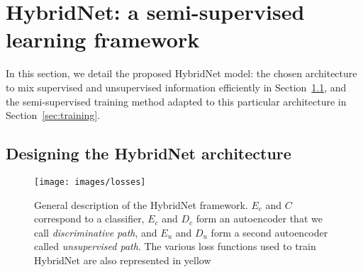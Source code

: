 \documentclass[runningheads]{llncs}
\begin{document}
\section{HybridNet: a semi-supervised learning framework}
\label{sec:architecture}

In this section, we detail the proposed HybridNet model: the chosen architecture to mix supervised and unsupervised information efficiently in Section~\ref{sec:archi}, and the semi-supervised training method adapted to this particular architecture in Section~\ref{sec:training}.

\subsection{Designing the HybridNet architecture}
\label{sec:archi}

\begin{figure}[tb]
	\centering
	\texttt{[image: images/losses]}
    \caption{General description of the HybridNet framework. $E_c$ and $C$ correspond to a classifier, $E_c$ and $D_c$ form an autoencoder that we call \textit{discriminative path}, and $E_u$ and $D_u$ form a second autoencoder called \textit{unsupervised path}. The various loss functions used to train HybridNet are also represented in yellow}
    \label{fig:general-archi}
\end{figure}
\end{document}
